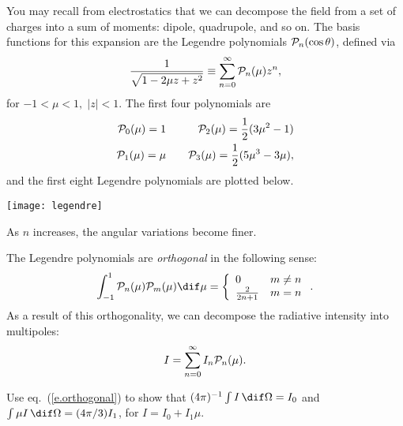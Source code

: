 \begin{sidebar}
\label{sb.intensity-decomposition}
You may recall from electrostatics that we can decompose the field from a set of charges into a sum of moments: dipole, quadrupole, and so on. The basis functions for this expansion are the Legendre polynomials $\mathcal{P}_{n}(\cos\theta)$, defined via
\[
	\frac{1}{\sqrt{1 - 2\mu z + z^{2}}} \equiv \sum_{n=0}^{\infty}\mathcal{P}_{n}(\mu)z^{n},
\]
for $-1<\mu<1,\;|z| < 1$. The first four polynomials are
\begin{eqnarray*}
	\mathcal{P}_{0}(\mu) = 1 &\quad& \mathcal{P}_{2}(\mu) = \frac{1}{2}(3\mu^{2}-1)\\
	\mathcal{P}_{1}(\mu) = \mu &\quad& \mathcal{P}_{3}(\mu) = \frac{1}{2}(5\mu^{3}-3\mu),
\end{eqnarray*}
and the first eight Legendre polynomials are plotted below.

\texttt{[image: legendre]}

\noindent As $n$ increases, the angular variations become finer.

The Legendre polynomials are \emph{orthogonal} in the following sense:
\begin{equation}\label{e.orthogonal}
\int_{-1}^{1}\Pl{n}(\mu)\Pl{m}(\mu)\dif \mu = \left\{
\begin{array}{lr}
	0 &  m\neq n\\
	\frac{2}{2n+1} & m=n
\end{array}\right..
\end{equation}
As a result of this orthogonality, we can decompose the radiative intensity into multipoles:
\begin{equation}\label{e.decomposition}
	I = \sum_{n=0}^{\infty} I_{n} \mathcal{P}_{n}(\mu).
\end{equation}

\begin{exercisebox}
\label{e.symmetry-powers-mu}
Use eq.~(\ref{e.orthogonal}) to show that $(4\pi)^{-1}\int I\,\dif\Omega = I_{0}$ and $\int \mu I\,\dif\Omega = (4\pi/3)I_{1}$, for $I = I_{0} + I_{1}\mu$.
\end{exercisebox}

\end{sidebar}

